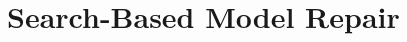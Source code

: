 \documentclass[letterpaper]{article} %
\newcommand{\hydra}{\textsc{Hydra}\xspace} %
\newcommand{\roni}[1]{{\textcolor{green}{[Roni: #1]}}}
\begin{document}



\section{Search-Based Model Repair}



\end{document}
